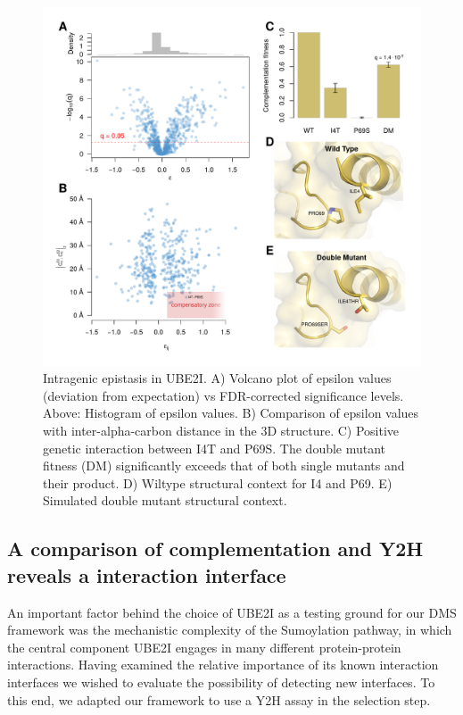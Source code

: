 \begin{figure}[h!]
	\centering
	\includegraphics[width=\textwidth]{img/epistasis.pdf}
	\caption{Intragenic epistasis in UBE2I. A) Volcano plot of epsilon values (deviation from expectation) vs FDR-corrected significance levels. Above: Histogram of epsilon values. B) Comparison of epsilon values with inter-alpha-carbon distance in the 3D structure. C) Positive genetic interaction between I4T and P69S. The double mutant fitness (DM) significantly exceeds that of both single mutants and their product. D) Wiltype structural context for I4 and P69. E) Simulated double mutant structural context.}
	\label{fig:epsistasis}
\end{figure}


\subsection{A comparison of complementation and Y2H reveals a interaction interface}

An important factor behind the choice of UBE2I as a testing ground for our DMS framework was the mechanistic complexity of the Sumoylation pathway, in which the central component UBE2I engages in many different protein-protein interactions. Having examined the relative importance of its known interaction interfaces we wished to evaluate the possibility of detecting new interfaces. To this end, we adapted our framework to use a Y2H assay in the selection step.

